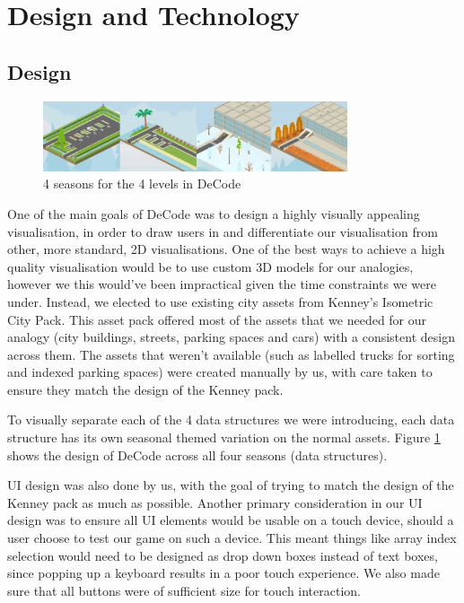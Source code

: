 \documentclass[11pt]{article}
\begin{document}
\section{Design and Technology}
\subsection{Design}
\begin{figure}
  \centering
  \includegraphics[width=0.8\textwidth]{images/seasons.png}
\caption{4 seasons for the 4 levels in DeCode}
\label{fig:seasons}
\end{figure}
One of the main goals of DeCode was to design a highly visually appealing visualisation, in order to draw users in and differentiate our visualisation from other, more standard, 2D visualisations. One of the best ways to achieve a high quality visualisation would be to use custom 3D models for our analogies, however we this would've been impractical given the time constraints we were under. Instead, we elected to use existing city assets from Kenney's Isometric City Pack\cite{KenneyAssets}. This asset pack offered most of the assets that we needed for our analogy (city buildings, streets, parking spaces and cars) with a consistent design across them. The assets that weren't available (such as labelled trucks for sorting and indexed parking spaces) were created manually by us, with care taken to ensure they match the design of the Kenney pack.\par
To visually separate each of the 4 data structures we were introducing, each data structure has its own seasonal themed variation on the normal assets. Figure \ref{fig:seasons} shows the design of DeCode across all four seasons (data structures).\par
UI design was also done by us, with the goal of trying to match the design of the Kenney pack as much as possible. Another primary consideration in our UI design was to ensure all UI elements would be usable on a touch device, should a user choose to test our game on such a device. This meant things like array index selection would need to be designed as drop down boxes instead of text boxes, since popping up a keyboard results in a poor touch experience. We also made sure that all buttons were of sufficient size for touch interaction.
\end{document}
